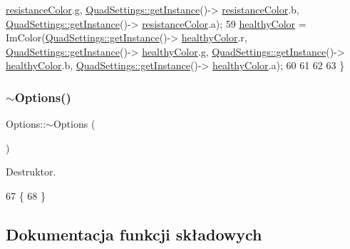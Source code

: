 \begin{DoxyCode}
      \mbox{\hyperlink{class_quad_settings_a9d813ff930e92de96045aa982b99b177}{resistanceColor}}.g, \mbox{\hyperlink{class_quad_settings_a20d7cfd0c56c11adcdf75c5e3011de67}{QuadSettings::getInstance}}()->
      \mbox{\hyperlink{class_quad_settings_a9d813ff930e92de96045aa982b99b177}{resistanceColor}}.b, \mbox{\hyperlink{class_quad_settings_a20d7cfd0c56c11adcdf75c5e3011de67}{QuadSettings::getInstance}}()->
      \mbox{\hyperlink{class_quad_settings_a9d813ff930e92de96045aa982b99b177}{resistanceColor}}.a);
59     \mbox{\hyperlink{class_options_a2da8226b9f582ed5e1870857f045151f}{healthyColor}} = ImColor(\mbox{\hyperlink{class_quad_settings_a20d7cfd0c56c11adcdf75c5e3011de67}{QuadSettings::getInstance}}()->
      \mbox{\hyperlink{class_options_a2da8226b9f582ed5e1870857f045151f}{healthyColor}}.r, \mbox{\hyperlink{class_quad_settings_a20d7cfd0c56c11adcdf75c5e3011de67}{QuadSettings::getInstance}}()->
      \mbox{\hyperlink{class_quad_settings_ad170bfeb3a4bc5157107cc07eba36067}{healthyColor}}.g, \mbox{\hyperlink{class_quad_settings_a20d7cfd0c56c11adcdf75c5e3011de67}{QuadSettings::getInstance}}()->
      \mbox{\hyperlink{class_quad_settings_ad170bfeb3a4bc5157107cc07eba36067}{healthyColor}}.b, \mbox{\hyperlink{class_quad_settings_a20d7cfd0c56c11adcdf75c5e3011de67}{QuadSettings::getInstance}}()->
      \mbox{\hyperlink{class_quad_settings_ad170bfeb3a4bc5157107cc07eba36067}{healthyColor}}.a);
60 
61 
62 
63 \}
\end{DoxyCode}
\mbox{\label{class_options_a86ddb85b183f8b58af5481f30a42fa92}} 
\subsubsection{\texorpdfstring{$\sim$\+Options()}{~Options()}}
{\footnotesize\ttfamily Options\+::$\sim$\+Options (\begin{DoxyParamCaption}{ }\end{DoxyParamCaption})}

Destruktor. 
\begin{DoxyCode}
67 \{
68 \}
\end{DoxyCode}


\subsection{Dokumentacja funkcji składowych}
\mbox{\label{class_options_aba27e24489aab55dc9d1d3c436709a73}} 
